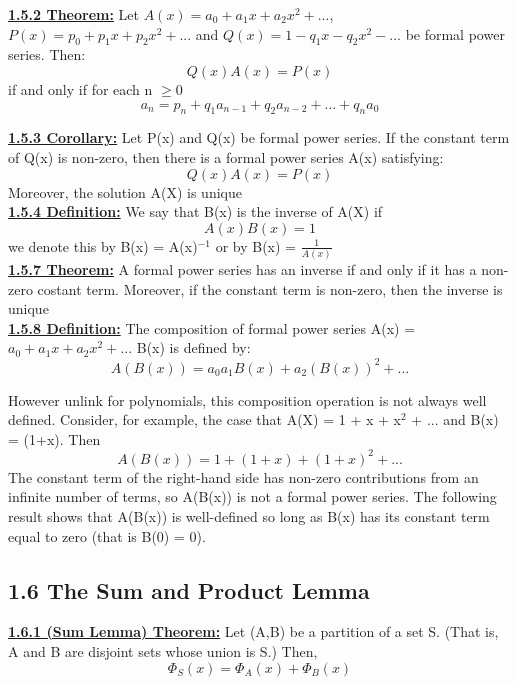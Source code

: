 \documentclass[12pt]{article}
\newcommand{\myt}[1]{\textbf{\underline{#1}}}
\begin{document}
	\myt{1.5.2 Theorem:} Let $A(x) = a_0 + a_1x + a_2x^2 + ...$, $P(x) = p_0 + p_1x +p_2x^2 + ...$ and $Q(x) = 1 - q_1x - q_2x^2 - ...$ be formal power series. Then:\\
	$$Q(x)A(x) = P(x)$$
	if and only if for each n $\geq 0$\\
	$$a_n = p_n + q_1a_{n-1} + q_2a_{n-2} + ... + q_na_0$$
	
	\myt{1.5.3 Corollary:} Let P(x) and Q(x) be formal power series. If the constant term of Q(x) is non-zero, then there is a formal power series A(x) satisfying:\\
	$$Q(x)A(x) = P(x)$$
	Moreover, the solution A(X) is unique\\
	
	\myt{1.5.4 Definition:} We say that B(x) is the inverse of A(X) if\\
	$$A(x)B(x) = 1$$
	we denote this by B(x) = A(x)$^{-1}$ or by B(x) = $\frac{1}{A(x)}$\\
	
	\myt{1.5.7 Theorem:} A formal power series has an inverse if and only if it has a non-zero costant term. Moreover, if the constant term is non-zero, then the inverse is unique\\
	
	\myt{1.5.8 Definition:} The composition of formal power series A(x) = $a_0 + a_1x + a_2x^2 + ... $ B(x) is defined by:\\
	$$A(B(x)) = a_0 a_1B(x) + a_2(B(x))^2 + ...$$
	
	However unlink for polynomials, this composition operation is not always well defined. Consider, for example, the case that A(X) = 1 + x + x$^2$ + ... and B(x) = (1+x). Then\\
	$$A(B(x)) = 1 + (1+x) + (1+x)^2 + ...$$
	The constant term of the right-hand side has non-zero contributions from an infinite number of terms, so A(B(x)) is not a formal power series. The following result shows that A(B(x)) is well-defined so long as B(x) has its constant term equal to zero (that is B(0) = 0).\\
	
	\subsection*{1.6 The Sum and Product Lemma}
	\myt{1.6.1 (Sum Lemma) Theorem:} Let (A,B) be a partition of a set S. (That is, A and B are disjoint sets whose union is S.) Then,\\
	$$\Phi_S(x) = \Phi_A(x) + \Phi_B(x)$$
	
\end{document}
